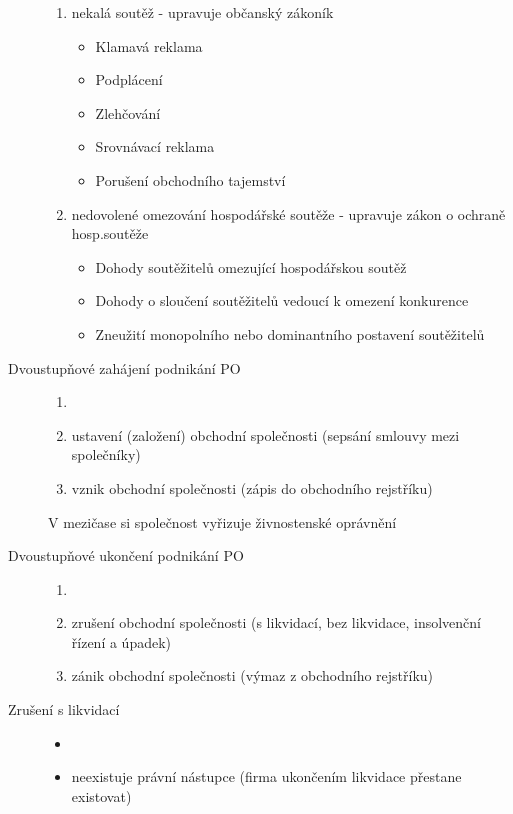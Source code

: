 \documentclass[11pt,a4paper,twoside]{book}
\begin{document}
\begin{description}
				\begin{enumerate}
					\item nekalá soutěž - upravuje občanský zákoník
					\begin{itemize}
						\item Klamavá reklama
						\item Podplácení
						\item Zlehčování
						\item Srovnávací reklama
						\item Porušení obchodního tajemství
					\end{itemize}
					\item nedovolené omezování hospodářské soutěže - upravuje zákon o ochraně hosp.soutěže
					\begin{itemize}
						\item Dohody soutěžitelů omezující hospodářskou soutěž
						\item Dohody o sloučení soutěžitelů vedoucí k omezení konkurence
						\item Zneužití monopolního nebo dominantního postavení soutěžitelů
					\end{itemize}
				\end{enumerate}
			\item[Dvoustupňové zahájení podnikání PO]
				\begin{enumerate}
					\item []
					\item ustavení (založení) obchodní společnosti (sepsání smlouvy mezi společníky)
					\item vznik obchodní společnosti (zápis do obchodního rejstříku)			
				\end{enumerate}
				V mezičase si společnost vyřizuje živnostenské oprávnění
			\item[Dvoustupňové ukončení podnikání PO]
				\begin{enumerate}
					\item []
					\item zrušení obchodní společnosti (s likvidací, bez likvidace, insolvenční řízení a úpadek)
					\item zánik obchodní společnosti (výmaz z obchodního rejstříku)
				\end{enumerate}
			\item[Zrušení s likvidací]
				\begin{itemize}
					\item []
					\item neexistuje právní nástupce (firma ukončením likvidace přestane existovat)

\end{itemize}
\end{description}
\end{document}
